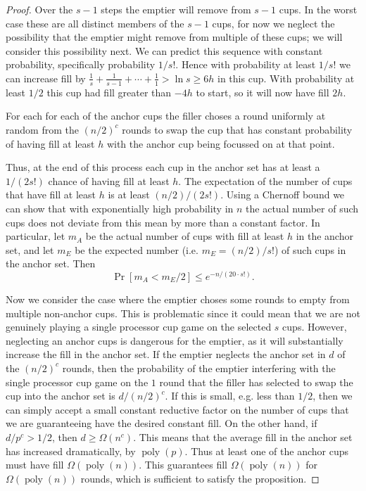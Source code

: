 \documentclass[twocolumn]{article}[11pt]
\DeclareMathOperator{\poly}{\text{poly}}
\begin{document}
\begin{proof}
  Over the $s-1$ steps the emptier will remove from $s-1$ cups. In the worst
  case these are all distinct members of the $s-1$ cups, for now we neglect the
  possibility that the emptier might remove from multiple of these cups; we
  will consider this possibility next. We can predict this
  sequence with constant probability, specifically probability $1/s!$. Hence
  with probability at least $1/s!$ we can increase fill by $\frac{1}{s} +
  \frac{1}{s-1} + \cdots + \frac{1}{1} > \ln s \ge 6h$ in this cup. With probability
  at least $1/2$ this cup had fill greater than $-4h$ to start, so it will now have fill $2h$.

  For each for each of the anchor cups the filler choses a round uniformly at
  random from the $(n/2)^c$ rounds to swap the cup that has constant probability of
  having fill at least $h$ with the anchor cup being focussed on at that point.

  Thus, at the end of this process each cup in the anchor set has at
  least a $1/(2s!)$ chance of having fill at least $h$. The expectation of
  the number of cups that have fill at least $h$ is at least $(n/2)/(2s!)$. 
  Using a Chernoff bound we can show that with exponentially high probability
  in $n$ the actual number of such cups does not deviate from this mean by more
  than a constant factor. In particular, let $m_A$ be the actual number of cups
  with fill at least $h$ in the anchor set, and let $m_E$ be the expected
  number (i.e.  $m_E = (n/2)/s!$) of such cups in the anchor set. Then
  $$\Pr[m_A < m_E /2 ] \le e^{-n / (20\cdot s!)}.$$ 

  Now we consider the case where the emptier choses some rounds to empty from
  multiple non-anchor cups. This is problematic since it could mean that we
  are not genuinely playing a single processor cup game on the selected $s$ cups.
  However, neglecting an anchor cups is dangerous for the emptier, as it will
  substantially increase the fill in the anchor set. If the emptier neglects
  the anchor set in $d$ of the $(n/2)^c$ rounds, then the probability of the
  emptier interfering with the single processor cup game on the $1$ round that
  the filler has selected to swap the cup into the anchor set is $d/(n/2)^c$. If
  this is small, e.g. less than $1/2$, then we can simply accept a small
  constant reductive factor on the number of cups that we are guaranteeing have
  the desired constant fill. On the other hand, if $d/p^c > 1/2$, then $d \ge \Omega(n^c)$. 
  This means that the average fill in the anchor set has increased dramatically, by $\poly(p)$.
  Thus at least one of the anchor cups must have fill $\Omega(\poly(n))$. This
  guarantees fill $\Omega(\poly(n))$ for $\Omega(\poly(n))$ rounds, which is
  sufficient to satisfy the proposition.

\end{proof}
\end{document}
